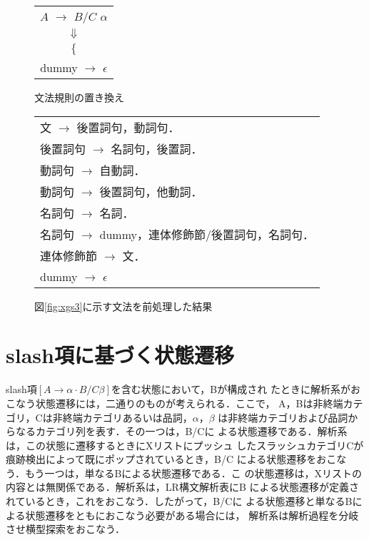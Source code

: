\begin{figure}[htbp]
\begin{center}
\begin{minipage}[b]{5cm}
  \begin{center}
    \begin{tabular}[h]{c}
      $A$ $\to$ $B$/$C$ $\alpha$ \\
      $\Downarrow$ \\
      $\biggl\{$
      \begin{minipage}[m]{3.5cm}
        $A$ $\to$ dummy $B$/$C$ $\alpha$ \\
        dummy $\to$ $\epsilon$ 
      \end{minipage}
    \end{tabular}
    \caption{文法規則の置き換え}
    \label{fig:replace}
  \end{center}
\end{minipage}
\hspace{5mm}
\begin{minipage}[b]{8.2cm}
  \begin{center}
    \begin{tabular}[h]{l}
      文 $\to$ 後置詞句，動詞句．\\
      後置詞句 $\to$ 名詞句，後置詞．\\
      動詞句 $\to$ 自動詞．\\
      動詞句 $\to$ 後置詞句，他動詞．\\
      名詞句 $\to$ 名詞．\\
      名詞句 $\to$ dummy，連体修飾節/後置詞句，名詞句．\\
      連体修飾節 $\to$ 文．\\
      dummy $\to$ $\epsilon$
    \end{tabular}
    \caption{図\ref{fig:xgs3}に示す文法を前処理した結果}
    \label{fig:xgs4}
  \end{center}
\end{minipage}
\end{center}
\end{figure}

\section{slash項に基づく状態遷移}

slash項$[A \to \alpha \cdot B/C \beta]$を含む状態において，Bが構成され
たときに解析系がおこなう状態遷移には，二通りのものが考えられる．ここで，
A，Bは非終端カテゴリ，Cは非終端カテゴリあるいは品詞，$\alpha$，$\beta$ 
は非終端カテゴリおよび品詞からなるカテゴリ列を表す．その一つは，B/Cに
よる状態遷移である．解析系は，この状態に遷移するときにXリストにプッシュ
したスラッシュカテゴリCが痕跡検出によって既にポップされているとき，B/C 
による状態遷移をおこなう．もう一つは，単なるBによる状態遷移である．こ
の状態遷移は，Xリストの内容とは無関係である．解析系は，LR構文解析表にB
による状態遷移が定義されているとき，これをおこなう．したがって，B/Cに
よる状態遷移と単なるBによる状態遷移をともにおこなう必要がある場合には，
解析系は解析過程を分岐させ横型探索をおこなう．

